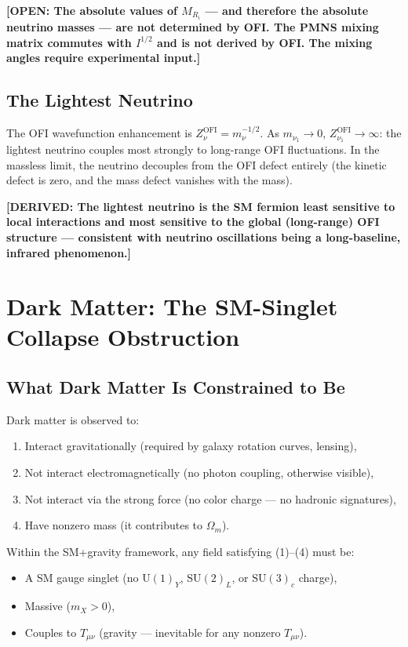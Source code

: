 \documentclass[12pt]{article}
\theoremstyle{definition}
\newcommand{\OFI}{\mathrm{OFI}}
\newcommand{\DERIVED}[1]{\textcolor{derivedcolor}{\textbf{[DERIVED: #1]}}}
\newcommand{\OPEN}[1]{\textcolor{opencolor}{\textbf{[OPEN: #1]}}}
\begin{document}
\OPEN{The absolute values of $M_{R_i}$ — and therefore the absolute
neutrino masses — are not determined by OFI.  The PMNS mixing matrix
commutes with $I^{1/2}$ and is not derived by OFI.  The mixing angles
require experimental input.}

\subsection{The Lightest Neutrino}

The OFI wavefunction enhancement is $Z^\OFI_\nu = m_\nu^{-1/2}$.
As $m_{\nu_1} \to 0$, $Z^\OFI_{\nu_1} \to \infty$: the lightest neutrino
couples most strongly to long-range OFI fluctuations.  In the massless
limit, the neutrino decouples from the OFI defect entirely (the kinetic
defect is zero, and the mass defect vanishes with the mass).

\DERIVED{The lightest neutrino is the SM fermion least sensitive to
local interactions and most sensitive to the global (long-range) OFI
structure — consistent with neutrino oscillations being a long-baseline,
infrared phenomenon.}

\section{Dark Matter: The SM-Singlet Collapse Obstruction}
\label{sec:darkmatter}

\subsection{What Dark Matter Is Constrained to Be}

Dark matter is observed to:
\begin{enumerate}
  \item Interact gravitationally (required by galaxy rotation curves, lensing),
  \item Not interact electromagnetically (no photon coupling, otherwise visible),
  \item Not interact via the strong force (no color charge — no hadronic signatures),
  \item Have nonzero mass (it contributes to $\Omega_m$).
\end{enumerate}

Within the SM+gravity framework, any field satisfying (1)--(4) must be:
\begin{itemize}
  \item A SM gauge singlet (no $\mathrm{U}(1)_Y$, $\mathrm{SU}(2)_L$, or $\mathrm{SU}(3)_c$ charge),
  \item Massive ($m_X > 0$),
  \item Couples to $T_{\mu\nu}$ (gravity — inevitable for any nonzero $T_{\mu\nu}$).
\end{itemize}
\end{document}
